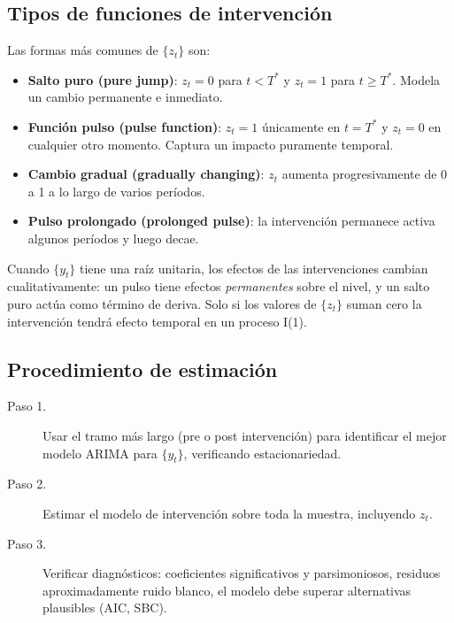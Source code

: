 \documentclass[12pt]{article}
\begin{document}
\subsection{Tipos de funciones de intervenci\'on}

Las formas m\'as comunes de $\{z_t\}$ son:

\begin{itemize}
  \item \textbf{Salto puro (pure jump)}: $z_t = 0$ para $t < T^*$ y $z_t = 1$ para $t \geq T^*$. Modela un cambio permanente e inmediato.
  \item \textbf{Funci\'on pulso (pulse function)}: $z_t = 1$ \'unicamente en $t = T^*$ y $z_t = 0$ en cualquier otro momento. Captura un impacto puramente temporal.
  \item \textbf{Cambio gradual (gradually changing)}: $z_t$ aumenta progresivamente de 0 a 1 a lo largo de varios per\'iodos.
  \item \textbf{Pulso prolongado (prolonged pulse)}: la intervenci\'on permanece activa algunos per\'iodos y luego decae.
\end{itemize}

\begin{intuicion}
Cuando $\{y_t\}$ tiene una ra\'iz unitaria, los efectos de las intervenciones cambian cualitativamente: un pulso tiene efectos \textit{permanentes} sobre el nivel, y un salto puro act\'ua como t\'ermino de deriva. Solo si los valores de $\{z_t\}$ suman cero la intervenci\'on tendr\'a efecto temporal en un proceso I(1).
\end{intuicion}

\subsection{Procedimiento de estimaci\'on}

\begin{description}
  \item[Paso 1.] Usar el tramo m\'as largo (pre o post intervenci\'on) para identificar el mejor modelo ARIMA para $\{y_t\}$, verificando estacionariedad.
  \item[Paso 2.] Estimar el modelo de intervenci\'on sobre toda la muestra, incluyendo $z_t$.
  \item[Paso 3.] Verificar diagn\'osticos: coeficientes significativos y parsimoniosos, residuos aproximadamente ruido blanco, el modelo debe superar alternativas plausibles (AIC, SBC).
\end{description}
\end{document}
